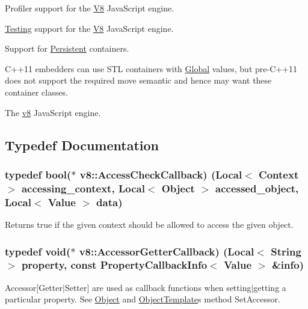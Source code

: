 Profiler support for the \hyperlink{classv8_1_1_v8}{V8} Java\+Script engine.

\hyperlink{classv8_1_1_testing}{Testing} support for the \hyperlink{classv8_1_1_v8}{V8} Java\+Script engine.

Support for \hyperlink{classv8_1_1_persistent}{Persistent} containers.

C++11 embedders can use S\+TL containers with \hyperlink{classv8_1_1_global}{Global} values, but pre-\/\+C++11 does not support the required move semantic and hence may want these container classes.

The \hyperlink{namespacev8}{v8} Java\+Script engine. 

\subsection{Typedef Documentation}
\subsubsection[{\texorpdfstring{Access\+Check\+Callback}{AccessCheckCallback}}]{\setlength{\rightskip}{0pt plus 5cm}typedef bool($\ast$ v8\+::\+Access\+Check\+Callback) ({\bf Local}$<$ {\bf Context} $>$ accessing\+\_\+context, {\bf Local}$<$ {\bf Object} $>$ accessed\+\_\+object, {\bf Local}$<$ {\bf Value} $>$ data)}\hypertarget{namespacev8_a1024fb358d107c1494163217830688e6}{}\label{namespacev8_a1024fb358d107c1494163217830688e6}
Returns true if the given context should be allowed to access the given object. 
\subsubsection[{\texorpdfstring{Accessor\+Getter\+Callback}{AccessorGetterCallback}}]{\setlength{\rightskip}{0pt plus 5cm}typedef void($\ast$ v8\+::\+Accessor\+Getter\+Callback) ({\bf Local}$<$ {\bf String} $>$ property, const {\bf Property\+Callback\+Info}$<$ {\bf Value} $>$ \&info)}\hypertarget{namespacev8_a722613c87061708a4f1aa050d095f868}{}\label{namespacev8_a722613c87061708a4f1aa050d095f868}
Accessor\mbox{[}Getter$\vert$\+Setter\mbox{]} are used as callback functions when setting$\vert$getting a particular property. See \hyperlink{classv8_1_1_object}{Object} and \hyperlink{classv8_1_1_object_template}{Object\+Template}\textquotesingle{}s method Set\+Accessor. 
